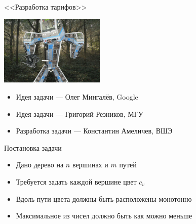 \begin{frame}
  \begin{center}
    \LARGE <<Разработка тарифов>>
  \end{center}

  \begin{center}
      \includegraphics[width=5cm]{memes/d-meme.jpg}
  \end{center}

  \begin{itemize}
  \item Идея задачи --- Олег Мингалёв, Google
  \item Идея задачи --- Григорий Резников, МГУ
  \item Разработка задачи --- Константин Амеличев, ВШЭ
  \end{itemize}

\end{frame}

\begin{frame}{Постановка задачи}

  \begin{itemize}
  \item Дано дерево на $n$ вершинах и $m$ путей
  \item Требуется задать каждой вершине цвет $c_v$
  \item Вдоль пути цвета должны быть расположены монотонно
  \item Максимальное из чисел должно быть как можно меньше
  \end{itemize}

\end{frame}

